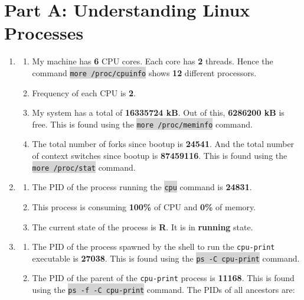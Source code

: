 \documentclass[a4paper]{article}
\newcommand{\command}[1]{\colorbox{lightgray}{\texttt{#1}}}
\begin{document}



\section*{Part A: Understanding Linux Processes}

\begin{enumerate}
	\item 
	\begin{enumerate}
		\item My machine has \textbf{6} CPU cores. Each core has \textbf{2} threads. Hence the command \command{more /proc/cpuinfo} shows \textbf{12} different processors.
		\item Frequency of each CPU is \textbf{2}.
		\item My system has a total of \textbf{16335724 kB}. Out of this, \textbf{6286200 kB} is free. This is found using the \command{more /proc/meminfo} command.
		\item The total number of forks since bootup is \textbf{24541}. And the total number of context switches since bootup is \textbf{87459116}. This is found using the \command{more /proc/stat} command.
	\end{enumerate}
	\item 
	\begin{enumerate}
		\item The PID of the process running the \command{cpu} command is \textbf{24831}.
		\item This process is consuming \textbf{100\%} of CPU and \textbf{0\%} of memory.
		\item The current state of the process is \textbf{R}. It is in \textbf{running} state.
	\end{enumerate}
	\item 
	\begin{enumerate}
		\item The PID of the process spawned by the shell to run the \texttt{cpu-print} executable is \textbf{27038}. This is found using the \command{ps -C cpu-print} command.
		\item The PID of the parent of the \texttt{cpu-print} process is \textbf{11168}. This is found using the \command{ps -f -C cpu-print} command. The PIDs of all ancestors are:

\end{enumerate}
\end{enumerate}
\end{document}
